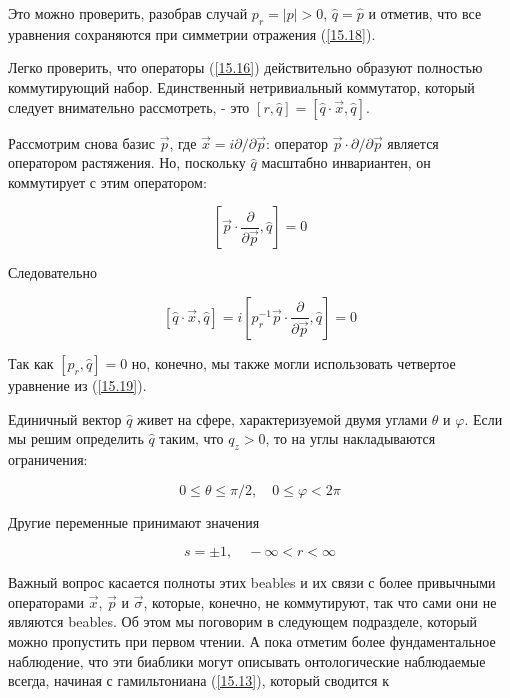 \documentclass[main.tex]{subfiles}
\begin{document}
Это можно проверить, разобрав случай $p_r = |p|>0$, $\hat q = \hat p$ и отметив, что все уравнения сохраняются при симметрии отражения (\ref{15.18}).

Легко проверить, что операторы (\ref{15.16}) действительно образуют полностью коммутирующий набор. Единственный нетривиальный коммутатор, который следует внимательно рассмотреть, - это $[r, \hat q] = [\hat q\cdot\vec x, \hat q]$.

Рассмотрим снова базис $\vec p$, где $\vec x = i\partial/\partial\vec p$: оператор $\vec p\cdot\partial/\partial\vec p$ является оператором растяжения. Но, поскольку $\hat q$ масштабно инвариантен, он коммутирует с этим оператором:

\begin{equation}\label{15.21}
	\left[\vec{p} \cdot \frac{\partial}{\partial \vec{p}}, \hat{q}\right]=0
\end{equation}

Следовательно

\begin{equation}\label{15.22}
	[\hat{q} \cdot \vec{x}, \hat{q}]=i\left[p_{r}^{-1} \vec{p} \cdot \frac{\partial}{\partial \vec{p}}, \hat{q}\right]=0
\end{equation}

Так как $[p_r,\hat q] = 0$ но, конечно, мы также могли использовать четвертое уравнение из (\ref{15.19}).

Единичный вектор $\hat q$ живет на сфере, характеризуемой двумя углами $\theta$ и $\varphi$. Если мы решим определить $\hat q$ таким, что $q_z > 0$, то на углы накладываются ограничения:

\begin{equation}\label{15.23}
	0 \leq \theta \leq \pi / 2, \quad 0 \leq \varphi<2 \pi
\end{equation}
                       
Другие переменные принимают значения

\begin{equation}\label{15.24}
	s=\pm 1, \quad-\infty<r<\infty
\end{equation}

Важный вопрос касается полноты этих beables и их связи с более привычными операторами $\vec x$, $\vec p$ и $\vec \sigma$, которые, конечно, не коммутируют, так что сами они не являются beables. Об этом мы поговорим в следующем подразделе, который можно пропустить при первом чтении. А пока отметим более фундаментальное наблюдение, что эти биаблики могут описывать онтологические наблюдаемые всегда, начиная с гамильтониана (\ref{15.13}), который сводится к 
\end{document}
